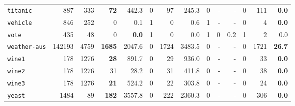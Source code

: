 \begin{tabular}{lccrrrrrrrrrrr}
\texttt{titanic} & \multicolumn{1}{r}{887} & \multicolumn{1}{r}{333}  & \textbf{72} & 442.3 & 0 & 97 & 245.3 & 0 & - & - & 0 & 111 & \textbf{0.0}\\
\texttt{vehicle} & \multicolumn{1}{r}{846} & \multicolumn{1}{r}{252}  & 0 & 0.1 & 1 & 0 & 0.6 & 1 & - & - & 0 & 4 & \textbf{0.0}\\
\texttt{vote} & \multicolumn{1}{r}{435} & \multicolumn{1}{r}{48}  & 0 & \textbf{0.0} & 1 & 0 & 0.0 & 1 & 0 & 0.2 & 1 & 2 & 0.0\\
\texttt{weather-aus} & \multicolumn{1}{r}{142193} & \multicolumn{1}{r}{4759}  & \textbf{1685} & 2047.6 & 0 & 1724 & 3483.5 & 0 & - & - & 0 & 1721 & \textbf{26.7}\\
\texttt{wine1} & \multicolumn{1}{r}{178} & \multicolumn{1}{r}{1276}  & \textbf{28} & 891.7 & 0 & 29 & 936.0 & 0 & - & - & 0 & 33 & \textbf{0.0}\\
\texttt{wine2} & \multicolumn{1}{r}{178} & \multicolumn{1}{r}{1276}  & 31 & 28.2 & 0 & 31 & 411.8 & 0 & - & - & 0 & 38 & \textbf{0.0}\\
\texttt{wine3} & \multicolumn{1}{r}{178} & \multicolumn{1}{r}{1276}  & \textbf{21} & 524.2 & 0 & 22 & 303.8 & 0 & - & - & 0 & 24 & \textbf{0.0}\\
\texttt{yeast} & \multicolumn{1}{r}{1484} & \multicolumn{1}{r}{89}  & \textbf{182} & 3557.8 & 0 & 222 & 2360.3 & 0 & - & - & 0 & 306 & \textbf{0.0}\\
\bottomrule
\end{tabular}
